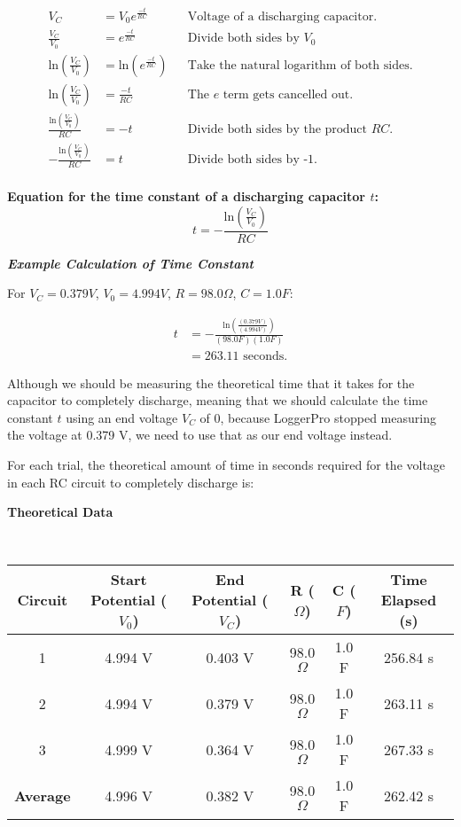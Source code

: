 \documentclass[12pt]{article}
\begin{document}
\begin{align*}
{V_C} &= V_0 e^{\frac{-t}{RC}} && \text{Voltage of a discharging capacitor.} \\
\frac{V_C}{V_0} &= e^{\frac{-t}{RC}} && \text{Divide both sides by $V_0$} \\
\text{ln}(\frac{V_C}{V_0}) &= \text{ln}(e^{\frac{-t}{RC}}) && \text{Take the natural logarithm of both sides.} \\
\text{ln}(\frac{V_C}{V_0}) &= \frac{-t}{RC} && \text{The $e$ term gets cancelled out.} \\
\frac{\text{ln}(\frac{V_C}{V_0})}{RC} &= -t && \text{Divide both sides by the product $RC$.} \\
-\frac{\text{ln}(\frac{V_C}{V_0})}{RC} &= t && \text{Divide both sides by -1.} \\
\end{align*}
\begin{tcolorbox}
\textbf{Equation for the time constant of a discharging capacitor $t$:}
$$t = -\frac{\text{ln}(\frac{V_C}{V_0})}{RC}$$ 
\end{tcolorbox}
\textbf{\emph{Example Calculation of Time Constant}}

For $V_C = 0.379 V$, $V_0 = 4.994 V$, $R = 98.0 \Omega$, $C = 1.0F$:

\begin{align*}
t &= -\frac{\text{ln}(\frac{(0.379 V)}{(4.994 V)})}{(98.0 F) (1.0 F)} \\
{} &= 263.11 \text{ seconds}.
\end{align*}

Although we should be measuring the theoretical time that it takes for the capacitor to completely discharge, meaning that we should calculate the time constant $t$ using an end voltage $V_C$ of 0, because LoggerPro stopped measuring the voltage at 0.379 V, we need to use that as our end voltage instead.

For each trial, the theoretical amount of time in seconds required for the voltage in each RC circuit to completely discharge is:
\begin{center}
\textbf{Theoretical Data}
\end{center}
\begin{table}[h!]
\centering
~\\
\begin{tabular}{||c c c c c c||} 
 \hline
\footnotesize Circuit & Start Potential ($V_0$) & End Potential ($V_C$) & R ($\Omega$) & C ($F$) & Time Elapsed (s) \\ [0.5ex] 
 \hline
 1 & 4.994 V & 0.403 V & 98.0$\Omega$ & 1.0 F & 256.84 s \\ 
 2 & 4.994 V & 0.379 V & 98.0$\Omega$ & 1.0 F & 263.11 s  \\
 3 & 4.999 V & 0.364 V & 98.0$\Omega$ & 1.0 F & 267.33 s \\ 
 \hline
 \textbf{Average} & 4.996 V & 0.382 V & 98.0$\Omega$ & 1.0 F & 262.42 s \\
 \hline
\end{tabular}
\end{table}
\end{document}
